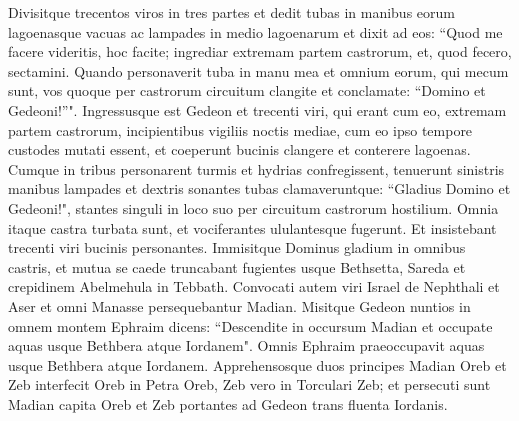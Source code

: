 \begin{biblechapter}
\verse Divisitque trecentos viros in tres partes et dedit tubas in manibus eorum lagoenasque vacuas ac lampades in medio lagoenarum 
\verse et dixit ad eos: “Quod me facere videritis, hoc facite; ingrediar extremam partem castrorum, et, quod fecero, sectamini. 
\verse Quando personaverit tuba in manu mea et omnium eorum, qui mecum sunt, vos quoque per castrorum circuitum clangite et conclamate: “Domino et Gedeoni!”". 
\verse Ingressusque est Gedeon et trecenti viri, qui erant cum eo, extremam partem castrorum, incipientibus vigiliis noctis mediae, cum eo ipso tempore custodes mutati essent, et coeperunt bucinis clangere et conterere lagoenas. 
\verse Cumque in tribus personarent turmis et hydrias confregissent, tenuerunt sinistris manibus lampades et dextris sonantes tubas clamaveruntque: “Gladius Domino et Gedeoni!", 
\verse stantes singuli in loco suo per circuitum castrorum hostilium. Omnia itaque castra turbata sunt, et vociferantes ululantesque fugerunt. 
\verse Et insistebant trecenti viri bucinis personantes. Immisitque Dominus gladium in omnibus castris, et mutua se caede truncabant fugientes usque Bethsetta, Sareda et crepidinem Abelmehula in Tebbath. 
\verse Convocati autem viri Israel de Nephthali et Aser et omni Manasse persequebantur Madian. 
\verse Misitque Gedeon nuntios in omnem montem Ephraim dicens: “Descendite in occursum Madian et occupate aquas usque Bethbera atque Iordanem". Omnis Ephraim praeoccupavit aquas usque Bethbera atque Iordanem. 
\verse Apprehensosque duos principes Madian Oreb et Zeb interfecit Oreb in Petra Oreb, Zeb vero in Torculari Zeb; et persecuti sunt Madian capita Oreb et Zeb portantes ad Gedeon trans fluenta Iordanis. 
\end{biblechapter}

